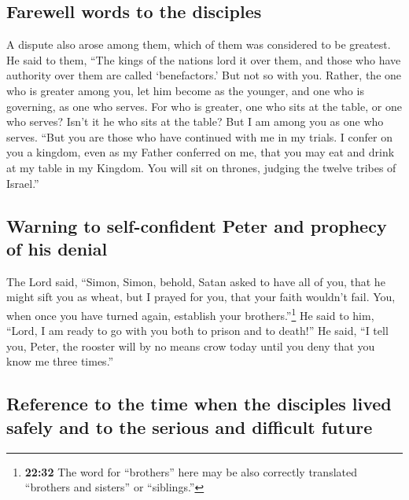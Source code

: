 \hypertarget{farewell-words-to-the-disciples}{%
\subsection{Farewell words to the
disciples}\label{farewell-words-to-the-disciples}}

 A dispute also arose among them, which of them was
considered to be greatest.  He said to them, ``The kings
of the nations lord it over them, and those who have authority over them
are called `benefactors.'  But not so with you. Rather,
the one who is greater among you, let him become as the younger, and one
who is governing, as one who serves.  For who is greater,
one who sits at the table, or one who serves? Isn't it he who sits at
the table? But I am among you as one who serves.  ``But
you are those who have continued with me in my trials.  I
confer on you a kingdom, even as my Father conferred on me,
 that you may eat and drink at my table in my Kingdom.
You will sit on thrones, judging the twelve tribes of Israel.''

\hypertarget{warning-to-self-confident-peter-and-prophecy-of-his-denial}{%
\subsection{Warning to self-confident Peter and prophecy of his
denial}\label{warning-to-self-confident-peter-and-prophecy-of-his-denial}}

 The Lord said, ``Simon, Simon, behold, Satan asked to
have all of you, that he might sift you as wheat,  but I
prayed for you, that your faith wouldn't fail. You, when once you have
turned again, establish your brothers.''\footnote{\textbf{22:32} The
  word for ``brothers'' here may be also correctly translated ``brothers
  and sisters'' or ``siblings.''}  He said to him,
``Lord, I am ready to go with you both to prison and to death!''
 He said, ``I tell you, Peter, the rooster will by no
means crow today until you deny that you know me three times.''

\hypertarget{reference-to-the-time-when-the-disciples-lived-safely-and-to-the-serious-and-difficult-future}{%
\subsection{Reference to the time when the disciples lived safely and to
the serious and difficult
future}\label{reference-to-the-time-when-the-disciples-lived-safely-and-to-the-serious-and-difficult-future}}

